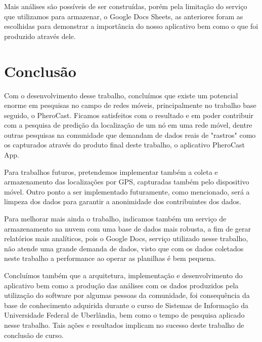 \documentclass[12pt, %
openright, 
oneside,
a4paper,
brazil]{facom-ufu-abntex2}
\begin{document}
Mais análises são possíveis de ser construídas, porém pela limitação do serviço que utilizamos para armazenar, o Google Docs Sheets, as anteriores foram as escolhidas para demonstrar a importância do nosso aplicativo bem como o que foi produzido através dele.


\chapter{Conclusão}




Com o desenvolvimento desse trabalho, concluímos que existe um potencial enorme em pesquisas no campo de redes móveis, principalmente no trabalho base seguido, o PheroCast. Ficamos satisfeitos com o resultado e em poder contribuir com a pesquisa de predição da localização de um nó em uma rede móvel, dentre outras pesquisas na comunidade que demandam de dados reais de "rastros" como os capturados através do produto final deste trabalho, o aplicativo PheroCast App.

Para trabalhos futuros, pretendemos implementar também a coleta e armazenamento das localizações por GPS, capturadas também pelo dispositivo móvel. Outro ponto a ser implementado futuramente, como mencionado, será a limpeza dos dados para garantir a anonimidade dos contribuintes dos dados.

Para melhorar mais ainda o trabalho, indicamos também um serviço de armazenamento na nuvem com uma base de dados mais robusta, a fim de gerar relatórios mais analíticos, pois o Google Docs, serviço utilizado nesse trabalho, não atende uma grande demanda de dados, visto que com os dados coletados neste trabalho a performance ao operar as planilhas é bem pequena. 

Concluímos também que a arquitetura, implementação e desenvolvimento do aplicativo bem como a produção das análises com os dados produzidos pela utilização do software por algumas pessoas da comunidade, foi consequência da base de conhecimento adquirida durante o curso de Sistemas de Informação da Universidade Federal de Uberlândia, bem como o tempo de pesquisa aplicado nesse trabalho. Tais ações e resultados implicam no sucesso deste trabalho de conclusão de curso.
\end{document}
